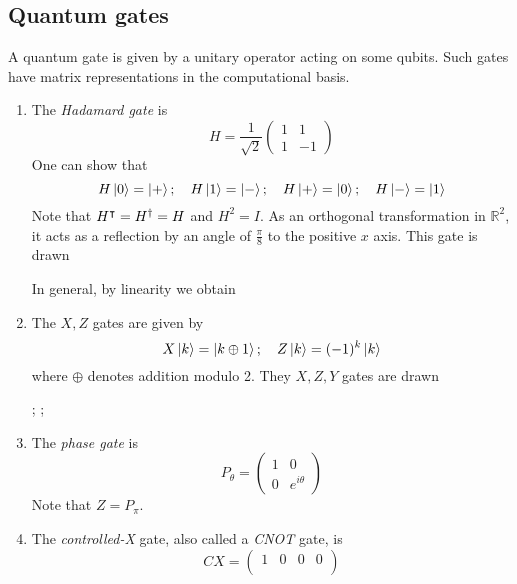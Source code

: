 \subsection{Quantum gates}
A quantum gate is given by a unitary operator acting on some qubits.
Such gates have matrix representations in the computational basis.
\begin{enumerate}
    \item The \emph{Hadamard gate} is
    \[ H = \frac{1}{\sqrt{2}} \begin{pmatrix}
        1 & 1 \\
        1 & -1
    \end{pmatrix} \]
    One can show that
    \[ H \ket{0} = \ket{+};\quad H\ket{1} = \ket{-};\quad H\ket{+} = \ket{0};\quad H\ket{-} = \ket{1} \]
    Note that \( H^\intercal = H^\dagger = H \) and \( H^2 = I \).
    As an orthogonal transformation in \( \mathbb R^2 \), it acts as a reflection by an angle of \( \frac{\pi}{8} \) to the positive \( x \) axis.
    This gate is drawn
    \begin{center}
        \leavevmode
    \end{center}
    In general, by linearity we obtain
    \begin{center}
        \leavevmode
    \end{center}
    \item The \( X, Z \) gates are given by
    \[ X \ket{k} = \ket{k \oplus 1};\quad Z \ket{k} = (-1)^k \ket{k} \]
    where \( \oplus \) denotes addition modulo 2.
    They \( X, Z, Y \) gates are drawn
    \begin{center}
        \leavevmode
        ;\quad
        ;\quad
    \end{center}
    \item The \emph{phase gate} is
    \[ P_\theta = \begin{pmatrix}
        1 & 0 \\
        0 & e^{i\theta}
    \end{pmatrix} \]
    Note that \( Z = P_\pi \).
    \item The \emph{controlled-X} gate, also called a \emph{CNOT} gate, is
    \[ CX = \begin{pmatrix}
        1 & 0 & 0 & 0 \\

\end{pmatrix}\]
\end{enumerate}
